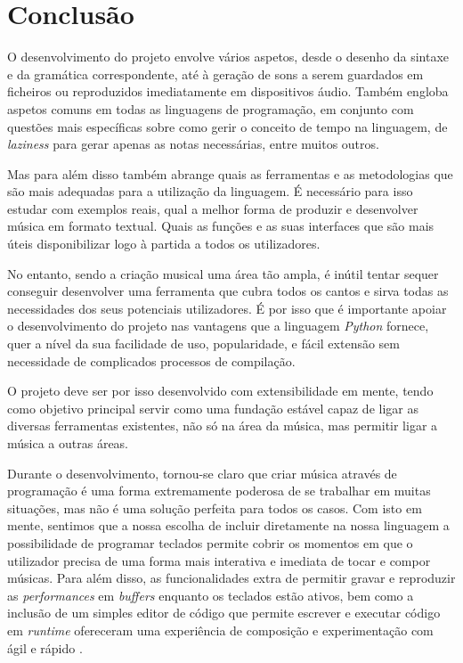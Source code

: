 \chapter{Conclusão}
O desenvolvimento do projeto envolve vários aspetos, desde o desenho da sintaxe e da gramática correspondente, até à geração de sons a serem guardados em ficheiros ou reproduzidos imediatamente em dispositivos áudio. Também engloba aspetos comuns em todas as linguagens de programação, em conjunto com questões mais específicas sobre como gerir o conceito de tempo na linguagem, de \textit{laziness} para gerar apenas as notas necessárias, entre muitos outros.

Mas para além disso também abrange quais as ferramentas e as metodologias que são mais adequadas para a utilização da linguagem. É necessário para isso estudar com exemplos reais, qual a melhor forma de produzir e desenvolver música em formato textual. Quais as funções e as suas interfaces que são mais úteis disponibilizar logo à partida a todos os utilizadores.

No entanto, sendo a criação musical uma área tão ampla, é inútil tentar sequer conseguir desenvolver uma ferramenta que cubra todos os cantos e sirva todas as necessidades dos seus potenciais utilizadores. É por isso que é importante apoiar o desenvolvimento do projeto nas vantagens que a linguagem \textit{Python} fornece, quer a nível da sua facilidade de uso, popularidade, e fácil extensão sem necessidade de complicados processos de compilação.

O projeto deve ser por isso desenvolvido com extensibilidade em mente, tendo como objetivo principal servir como uma fundação estável capaz de ligar as diversas ferramentas existentes, não só na área da música, mas permitir ligar a música a outras áreas.

Durante o desenvolvimento, tornou-se claro que criar música através de programação é uma forma extremamente poderosa de se trabalhar em muitas situações, mas não é uma solução perfeita para todos os casos. Com isto em mente, sentimos que a nossa escolha de incluir diretamente na nossa linguagem a possibilidade de programar teclados permite cobrir os momentos em que o utilizador precisa de uma forma mais interativa e imediata de tocar e compor músicas. Para além disso, as funcionalidades extra de permitir gravar e reproduzir as \textit{performances} em \textit{buffers} enquanto os teclados estão ativos, bem como a inclusão de um simples editor de código que permite escrever e executar código em \textit{runtime} ofereceram uma experiência de composição e experimentação com ágil e rápido .

